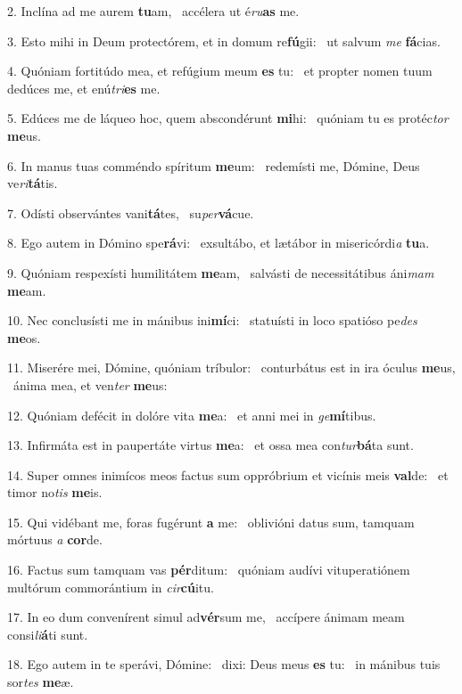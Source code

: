 2. Inclína ad me aurem \textbf{tu}am, \ast\  accélera ut é\textit{ru}\textbf{as} me.\

3. Esto mihi in Deum protectórem, et in domum re\textbf{fú}gii: \ast\  ut salvum \textit{me} \textbf{fá}cias.\

4. Quóniam fortitúdo mea, et refúgium meum \textbf{es} tu: \ast\  et propter nomen tuum dedúces me, et enú\textit{tri}\textbf{es} me.\

5. Edúces me de láqueo hoc, quem abscondérunt \textbf{mi}hi: \ast\  quóniam tu es protéc\textit{tor} \textbf{me}us.\

6. In manus tuas comméndo spíritum \textbf{me}um: \ast\  redemísti me, Dómine, Deus ve\textit{ri}\textbf{tá}tis.\

7. Odísti observántes vani\textbf{tá}tes, \ast\  su\textit{per}\textbf{vá}cue.\

8. Ego autem in Dómino spe\textbf{rá}vi: \ast\  exsultábo, et lætábor in misericórdi\textit{a} \textbf{tu}a.\

9. Quóniam respexísti humilitátem \textbf{me}am, \ast\  salvásti de necessitátibus áni\textit{mam} \textbf{me}am.\

10. Nec conclusísti me in mánibus ini\textbf{mí}ci: \ast\  statuísti in loco spatióso pe\textit{des} \textbf{me}os.\

11. Miserére mei, Dómine, quóniam tríbulor: \dag\  conturbátus est in ira óculus \textbf{me}us, \ast\  ánima mea, et ven\textit{ter} \textbf{me}us:\

12. Quóniam defécit in dolóre vita \textbf{me}a: \ast\  et anni mei in \textit{ge}\textbf{mí}tibus.\

13. Infirmáta est in paupertáte virtus \textbf{me}a: \ast\  et ossa mea con\textit{tur}\textbf{bá}ta sunt.\

14. Super omnes inimícos meos factus sum oppróbrium et vicínis meis \textbf{val}de: \ast\  et timor no\textit{tis} \textbf{me}is.\

15. Qui vidébant me, foras fugérunt \textbf{a} me: \ast\  oblivióni datus sum, tamquam mórtuus \textit{a} \textbf{cor}de.\

16. Factus sum tamquam vas \textbf{pér}ditum: \ast\  quóniam audívi vituperatiónem multórum commorántium in \textit{cir}\textbf{cú}itu.\

17. In eo dum convenírent simul ad\textbf{vér}sum me, \ast\  accípere ánimam meam consi\textit{li}\textbf{á}ti sunt.\

18. Ego autem in te sperávi, Dómine: \dag\  dixi: Deus meus \textbf{es} tu: \ast\  in mánibus tuis sor\textit{tes} \textbf{me}æ.\

